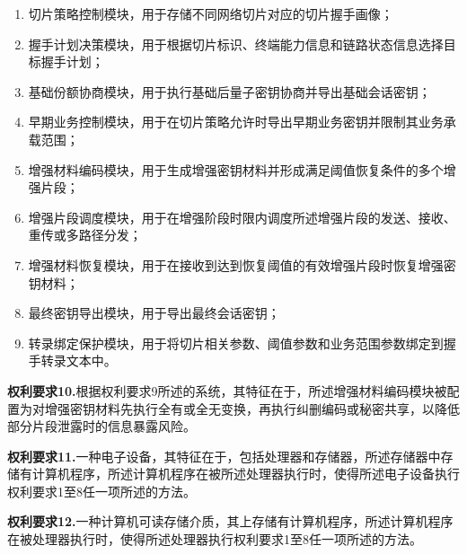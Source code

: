 \documentclass[12pt,a4paper]{article}
\begin{document}
\begin{enumerate}[label=\alph*), leftmargin=2em]
    \item 切片策略控制模块，用于存储不同网络切片对应的切片握手画像；
    \item 握手计划决策模块，用于根据切片标识、终端能力信息和链路状态信息选择目标握手计划；
    \item 基础份额协商模块，用于执行基础后量子密钥协商并导出基础会话密钥；
    \item 早期业务控制模块，用于在切片策略允许时导出早期业务密钥并限制其业务承载范围；
    \item 增强材料编码模块，用于生成增强密钥材料并形成满足阈值恢复条件的多个增强片段；
    \item 增强片段调度模块，用于在增强阶段时限内调度所述增强片段的发送、接收、重传或多路径分发；
    \item 增强材料恢复模块，用于在接收到达到恢复阈值的有效增强片段时恢复增强密钥材料；
    \item 最终密钥导出模块，用于导出最终会话密钥；
    \item 转录绑定保护模块，用于将切片相关参数、阈值参数和业务范围参数绑定到握手转录文本中。
\end{enumerate}

\vspace{0.5cm}

\textbf{权利要求10.}根据权利要求9所述的系统，其特征在于，所述增强材料编码模块被配置为对增强密钥材料先执行全有或全无变换，再执行纠删编码或秘密共享，以降低部分片段泄露时的信息暴露风险。

\vspace{0.5cm}

\textbf{权利要求11.}一种电子设备，其特征在于，包括处理器和存储器，所述存储器中存储有计算机程序，所述计算机程序在被所述处理器执行时，使得所述电子设备执行权利要求1至8任一项所述的方法。

\vspace{0.5cm}

\textbf{权利要求12.}一种计算机可读存储介质，其上存储有计算机程序，所述计算机程序在被处理器执行时，使得所述处理器执行权利要求1至8任一项所述的方法。
\end{document}
